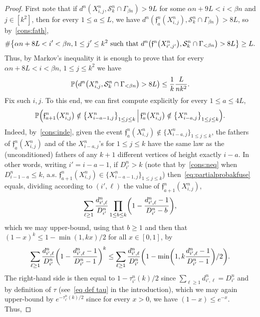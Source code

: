 \documentclass[AHL,Unicode,published]{cedram}
\newcommand{\proba}[1]{\mathbb{P}\left(#1\right)}
\newcommand{\1}{\mathbbm{1}}
\newcommand{\fath}{\mathfrak{f}}
\newcommand{\trail}{\mathcal{S}}
\let\originalleft\left
\let\originalright\right
\renewcommand{\left}{\mathopen{}\mathclose\bgroup\originalleft}
\renewcommand{\right}{\aftergroup\egroup\originalright}
\begin{document}
\begin{proof}
First note that if $d^n(X^n_{i,j},\trail^n_k \cap \Gamma_{\beta n})>9L$ for some $\alpha n +9L <i < \beta n$ and $j \in [k^2]$, then for every $1\leq a \leq L$, we have $d^n(\fath^n_a(X^n_{i,j}),\trail^n_k \cap \Gamma_{\beta n})>8L$, so by~\ref{cons:fath},
\[
\#\left\{\alpha n+8L<i'<\beta n,1\leq j'\leq k^2 \text{ such that } d^n\left(\fath^n\left(X^n_{i',j'}\right),\trail^n_k \cap \Gamma_{<\beta n}\right)>8L\right\}\geq L.
\]
Thus, by Markov's inequality it is enough to prove that for every $\alpha n+8L<i<\beta n$, $1\leq j\leq k^2$ we have
\begin{equation}\label{eq:half_lem:chain}
\proba{d^n\left(X^n_{i,j},\trail^n_k \cap \Gamma_{<\beta n}\right)>8L}\leq \frac{1}{k} \frac{L}{nk^2}
.
\end{equation}
Fix such $i,j$. To this end, we can first compute explicitly for every $1\leq a\leq 4L$,
\begin{equation}\label{eq:partialprobakfuse}
\proba{\fath^n_{a+1}\left(X^n_{i,j}\right) \notin \left\{X^n_{i-a-1,j}\right\}_{1\leq j \leq k} \,\middle|\,\fath^n_{a}\left(X^n_{i,j}\right) \notin \left\{X^n_{i-a,j}\right\}_{1\leq j \leq k}}. 
\end{equation}
Indeed, by~\ref{cons:inde}, given the event $\fath^n_{a}(X^n_{i,j}) \notin \{X^n_{i-a,j}\}_{1\leq j \leq k}$, the fathers of $\fath^n_{a}(X^n_{i,j})$ and of the $X^n_{i-a,j}$'s for ${1\leq j \leq k}$ have the same law as the (unconditioned) father{s} of any $k+1$ different vertices of height exactly $i-a$. In other words, writing $i'=i-a-1$, if $D_{i'}^n>k$ (note that by~\ref{cons:neq} when $D^n_{i-1-a}\leq k$, a.s. $\fath^n_{a+1}(X^n_{i,j})\in \{X^n_{i-a-1,j}\}_{1\leq j \leq k}$) then~\eqref{eq:partialprobakfuse} equals, dividing according to $({i',\ell})$ the value of $\fath^n_{a+1}(X^n_{i,j})$,
\[
\sum_{\ell\ge 1} \frac{d_{i',\ell}^n}{D_{i'}^n} \prod_{1\leq b\leq k}\left (1-\frac{d_{i',\ell}^n-1}{D_{i'}^n-b}\right),
\]
which we may upper-bound, using that $b\geq 1$ and then that $(1-x)^k\leq 1-\min(1,kx)/2$ for all $x \in [0,1]$, by
\[
\sum_{\ell\ge 1} \frac{d_{i',\ell}^n}{D_{i'}^n} \left(1-\frac{d_{i',\ell}^n-1}{D_{i'}^n-1}\right)^k \leq \sum_{\ell\ge 1} \frac{d_{i',\ell}^n}{D_{i'}^n}\left (1-\min\left (1,k\frac{d_{i',\ell}^n-1}{D_{i'}^n-1} \right)/2\right).
\]
The right-hand side is then equal to $1-\tau_{i'}^n(k)/2$ since $\sum_{\ell\ge1} d_{i',\ell}^n=D_{i'}^n$ and by definition of $\tau$ (see~\eqref{eq def tau} in the introduction), which we may again upper-bound by $e^{-\tau_{i'}^n(k)/2}$ since for every $x>0$, we have $(1-x)\leq e^{-x}$. Thus,

\end{proof}
\end{document}
